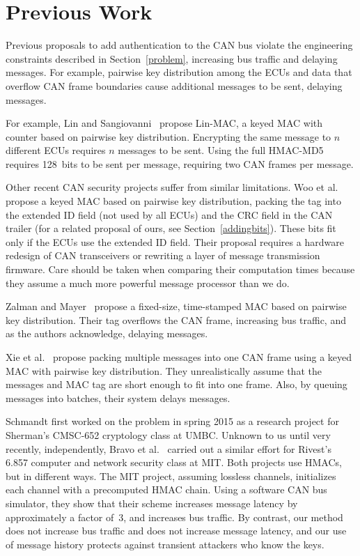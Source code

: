 \section{Previous Work}
\label{previous}

Previous proposals to add authentication to the CAN bus violate the engineering constraints described
in Section~\ref{problem}, increasing bus traffic and delaying messages.  For example, pairwise
key distribution among the ECUs and data that overflow CAN frame boundaries cause additional messages to be sent,
delaying messages.

For example, Lin and Sangiovanni~\cite{Lin-MAC} propose Lin-MAC, a keyed MAC with counter based on
pairwise key distribution.  Encrypting the same message to $n$ different ECUs requires $n$
messages to be sent.   Using the full HMAC-MD5 requires 128~bits to be sent per message, requiring two CAN frames per message.

Other recent CAN security projects suffer from similar limitations. 
Woo et al.~\cite{Woo-14} propose a keyed MAC based on pairwise key distribution,
packing the tag into the extended ID field (not used by all ECUs) and the CRC field in the CAN trailer
(for a related proposal of ours, see Section~\ref{addingbits}). 
These bits fit only if the ECUs use the extended ID field. 
Their proposal requires a hardware redesign of CAN transceivers or rewriting a layer of message transmission firmware.
Care should be taken when comparing their computation times because
they assume a much more powerful message processor than we do. 

Zalman and Mayer~\cite{Zalman-14} propose a fixed-size, time-stamped MAC based on pairwise key distribution.
Their tag overflows the CAN frame, increasing bus traffic, and as the authors acknowledge,
delaying messages.

Xie et al.~\cite{Xie-15} propose packing multiple messages into one CAN frame using a keyed MAC with 
pairwise key distribution.   They unrealistically assume that the messages and MAC tag are short
enough to fit into one frame.  Also, by queuing messages into batches, their system delays messages.

Schmandt first worked on the problem in spring 2015 as a research project for Sherman's CMSC-652 cryptology class at UMBC.
Unknown to us until very recently, independently, Bravo et al.~\cite{MIT2015} carried out a similar effort 
for Rivest's 6.857 computer and network security class at MIT.  Both projects use HMACs, but in different ways.
The MIT project, assuming lossless channels, initializes each channel with a precomputed HMAC chain.
Using a software CAN bus simulator, they show that their scheme increases message latency by
approximately a factor of~3, and increases bus traffic.  By contrast, our method does not increase
bus traffic and does not increase message latency, and our use of message history protects against transient
attackers who know the keys.

